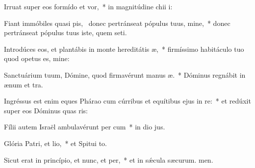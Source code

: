 \item Irruat super eos formído et vor,~* in magnitúdine chii i:
\item Fiant immóbiles quasi pis,~\pscross{} donec pertránseat pópulus tuus, mine,~* donec pertránseat pópulus tuus iste, quem seti.
\item Introdúces eos, et plantábis in monte hereditátis æ,~* firmíssimo habitáculo tuo quod opetus es, mine:
\item Sanctuárium tuum, Dómine, quod firmavérunt manus æ.~* Dóminus regnábit in ænum et tra.
\item Ingréssus est enim eques Phárao cum cúrribus et equítibus ejus in re:~* et redúxit super eos Dóminus quas ris:
\item Fílii autem Israël ambulavérunt per cum~* in dio jus.
\item Glória Patri, et lio,~* et Spitui to.
\item Sicut erat in princípio, et nunc, et per,~* et in sǽcula sæcurum. men.
